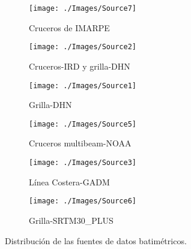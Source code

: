 \begin{figure}[H]
\centering
\begin{subfigure}[b]{0.32\linewidth}
\centering
\texttt{[image: ./Images/Source7]}
\caption{Cruceros de IMARPE}\label{fig:Source7}	
\end{subfigure}
\begin{subfigure}[b]{0.32\linewidth}
\centering
\texttt{[image: ./Images/Source2]}
\caption{Cruceros-IRD y grilla-DHN}\label{fig:Source2}
\end{subfigure}
\begin{subfigure}[b]{0.32\linewidth}
\centering
\texttt{[image: ./Images/Source1]}
\caption{Grilla-DHN}\label{fig:Source1}
\end{subfigure}
\begin{subfigure}[b]{0.32\linewidth}
\centering
\texttt{[image: ./Images/Source5]}
\caption{Cruceros multibeam-NOAA}\label{fig:Source5}	
\end{subfigure}
\begin{subfigure}[b]{0.32\linewidth}
\centering
\texttt{[image: ./Images/Source3]}
\caption{Línea Costera-GADM}\label{fig:Source3}
\end{subfigure}
\begin{subfigure}[b]{0.32\linewidth}
\centering
\texttt{[image: ./Images/Source6]}
\caption{Grilla-SRTM30\_PLUS}\label{fig:Source6}
\end{subfigure}
\caption{Distribución de las fuentes de datos batimétricos.}
\label{fig:bat_muestra}
\end{figure}

